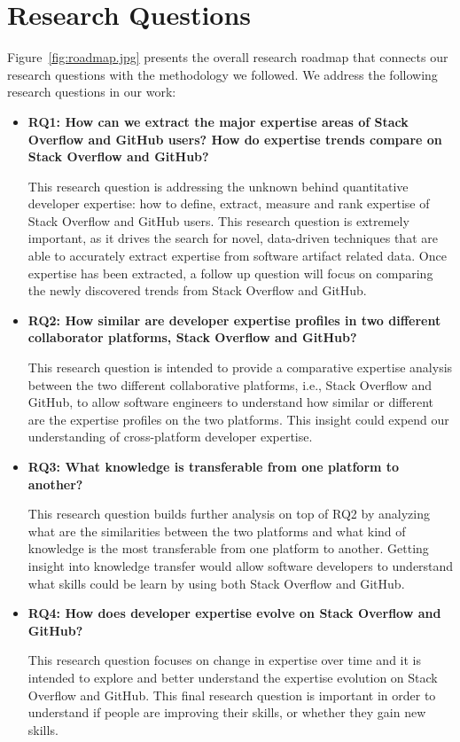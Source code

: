     \section{Research Questions\label{sec:RQs}}

        Figure~\ref{fig:roadmap.jpg} presents the overall research roadmap that connects our research questions with the methodology we followed. We address the following research questions in our work:
       
        \begin{itemize}
            \item \textbf{RQ1: How can we extract the major expertise areas of Stack Overflow and GitHub users? How do expertise trends compare on Stack Overflow and GitHub?}
            
            This research question is addressing the unknown behind quantitative developer expertise: how to define, extract, measure and rank expertise of Stack Overflow and GitHub users. This research question is extremely important, as it drives the search for novel, data-driven techniques that are able to accurately extract expertise from software artifact related data. Once expertise has been extracted, a follow up question will focus on comparing the newly discovered trends from Stack Overflow and GitHub.
            
            \item \textbf{RQ2: How similar are developer expertise profiles in two different collaborator platforms, Stack Overflow and GitHub?}
            
            This research question is intended to provide a comparative expertise analysis between the two different collaborative platforms, i.e., Stack Overflow and GitHub, to allow software engineers to understand how similar or different are the expertise profiles on the two platforms. This insight could expend our understanding of cross-platform developer expertise.
            
            \item \textbf{RQ3: What knowledge is transferable from one platform to another?}
            
            This research question builds further analysis on top of RQ2 by analyzing what are the similarities between the two platforms and what kind of knowledge is the most transferable from one platform to another. Getting insight into knowledge transfer would allow software developers to understand what skills could be learn by using both Stack Overflow and GitHub.
            
            \item \textbf{RQ4: How does developer expertise evolve on Stack Overflow and GitHub?}
            
            This research question focuses on change in expertise over time and it is intended to explore and better understand the expertise evolution on Stack Overflow and GitHub. This final research question is important in order to understand if people are improving their skills, or whether they gain new skills.
        \end{itemize}
        
